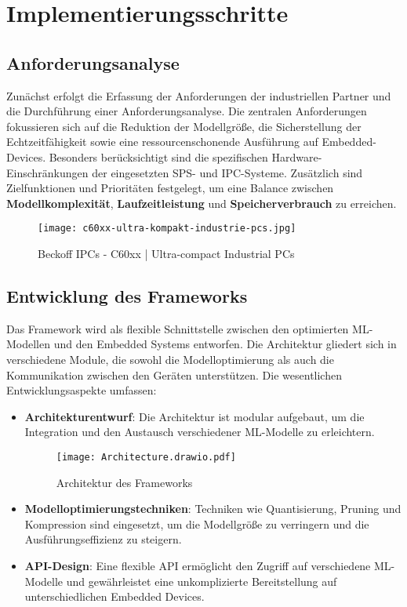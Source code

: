\section{Implementierungsschritte}

\subsection{Anforderungsanalyse}
Zunächst erfolgt die Erfassung der Anforderungen der industriellen Partner und die Durchführung einer Anforderungsanalyse. Die zentralen Anforderungen fokussieren sich 
auf die Reduktion der Modellgröße, die Sicherstellung der Echtzeitfähigkeit sowie eine ressourcenschonende Ausführung auf Embedded-Devices. Besonders berücksichtigt sind die 
spezifischen Hardware-Einschränkungen der eingesetzten SPS- und IPC-Systeme. Zusätzlich sind Zielfunktionen und Prioritäten festgelegt, um eine Balance zwischen \textbf{Modellkomplexität}, 
\textbf{Laufzeitleistung} und \textbf{Speicherverbrauch} zu erreichen.


\begin{figure}[h!]
    \centering
    \texttt{[image: c60xx-ultra-kompakt-industrie-pcs.jpg]} 
    \caption{Beckoff IPCs - C60xx | Ultra-compact Industrial PCs\cite{BeckhoffWebsite}} 
    \label{fig:beckoffipc} %
\end{figure}


\subsection{Entwicklung des Frameworks}
Das Framework wird als flexible Schnittstelle zwischen den optimierten ML-Modellen und den Embedded Systems entworfen. Die Architektur gliedert sich in verschiedene Module, 
die sowohl die Modelloptimierung als auch die Kommunikation zwischen den Geräten unterstützen. Die wesentlichen Entwicklungsaspekte umfassen:

\begin{itemize}
    \item \textbf{Architekturentwurf}: Die Architektur ist modular aufgebaut, um die Integration und den Austausch verschiedener ML-Modelle zu erleichtern.
    
    \begin{figure}[h!]
        \centering
        \texttt{[image: Architecture.drawio.pdf]} 
        \caption{Architektur des Frameworks} 
        \label{fig:architecture} %
    \end{figure}

    \item \textbf{Modelloptimierungstechniken}: Techniken wie Quantisierung, Pruning und Kompression sind eingesetzt, um die Modellgröße zu verringern und die 
    Ausführungseffizienz zu steigern.
    \item \textbf{API-Design}: Eine flexible API ermöglicht den Zugriff auf verschiedene ML-Modelle und gewährleistet eine unkomplizierte Bereitstellung auf unterschiedlichen 
    Embedded Devices.
\end{itemize}

